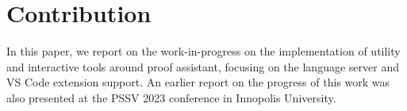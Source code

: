 \section{Contribution}

In this paper, we report on the work-in-progress on the implementation of
utility and interactive tools around \Rzk{} proof assistant, focusing on
the language server and VS Code extension support.
An earlier report on the progress of this work was also presented at the PSSV 2023
\cite{PSSV2023} conference in Innopolis University.
